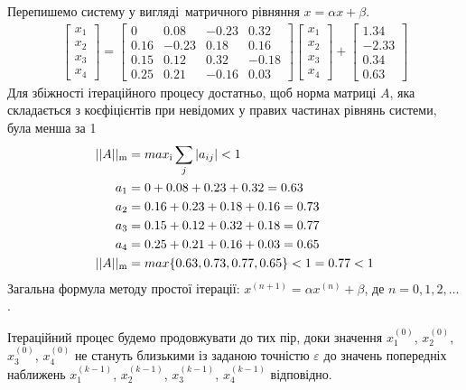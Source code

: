 Перепишемо систему у вигляді матричного рівняння $x = \alpha x + \beta$.
\begin{align*}
    \begin{bmatrix}
        x_1 \\
        x_2 \\
        x_3 \\
        x_4
    \end{bmatrix}
    =
    \begin{bmatrix}
        0    & 0.08  & -0.23 & 0.32  \\
        0.16 & -0.23 & 0.18  & 0.16  \\
        0.15 & 0.12  & 0.32  & -0.18 \\
        0.25 & 0.21  & -0.16 & 0.03
    \end{bmatrix}
    \begin{bmatrix}
        x_1 \\
        x_2 \\
        x_3 \\
        x_4
    \end{bmatrix}
    +
    \begin{bmatrix}
        1.34  \\
        -2.33 \\
        0.34  \\
        0.63
    \end{bmatrix}
\end{align*}
Для збіжності ітераційного процесу достатньо, щоб норма матриці $A$,
яка складається з коєфіцієнтів при невідомих у правих частинах рівнянь
системи, була менша за 1
\begin{align*}
    ||A|| \textsubscript{m} & = max \textsubscript{i} \sum_j |a_{ij}| < 1       \\
    a_1                     & = 0 + 0.08 + 0.23 + 0.32 = 0.63                   \\
    a_2                     & = 0.16 + 0.23 + 0.18 + 0.16 = 0.73                \\
    a_3                     & = 0.15 + 0.12 + 0.32 + 0.18 = 0.77                \\
    a_4                     & = 0.25 + 0.21 + 0.16 + 0.03 = 0.65                \\
    ||A|| \textsubscript{m} & = max \{ 0.63, 0.73, 0.77, 0.65 \} < 1 = 0.77 < 1
\end{align*}
Загальна формула методу простої ітерації:
$x^{(n + 1)} = \alpha x^{(n)} + \beta$,
де $n = 0, 1, 2, \dots$.

Ітераційний процес будемо продовжувати до тих пір,
доки значення
$x_1^{(0)}$,
$x_2^{(0)}$,
$x_3^{(0)}$,
$x_4^{(0)}$
не стануть близькими із заданою точністю $\varepsilon$
до значень попередніх наближень
$x_1^{(k - 1)}$,
$x_2^{(k - 1)}$,
$x_3^{(k - 1)}$,
$x_4^{(k - 1)}$
відповідно.


